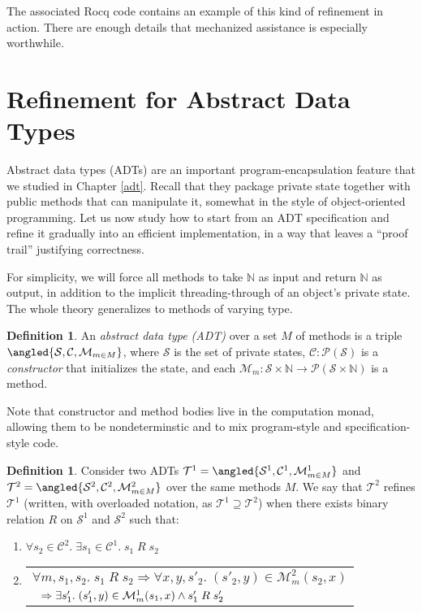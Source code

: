 \documentclass{amsbook}
\theoremstyle{definition}
\newtheorem{definition}[theorem]{Definition}
\theoremstyle{remark}
\numberwithin{section}{chapter}
\numberwithin{equation}{chapter}
\begin{document}
The associated Rocq code contains an example of this kind of refinement in action.
There are enough details that mechanized assistance is especially worthwhile.

\section{Refinement for Abstract Data Types}

Abstract data types (ADTs) are an important program-encapsulation feature that we studied in Chapter \ref{adt}.
Recall that they package private state together with public methods that can manipulate it, somewhat in the style of object-oriented programming.
Let us now study how to start from an ADT specification and refine it gradually into an efficient implementation, in a way that leaves a ``proof trail'' justifying correctness.

For simplicity, we will force all methods to take $\mathbb N$ as input and return $\mathbb N$ as output, in addition to the implicit threading-through of an object's private state.
The whole theory generalizes to methods of varying type.

\begin{definition}
  An \emph{abstract data type (ADT)} over a set $M$ of methods is a triple $\angled{\mathcal S, \mathcal C, \mathcal M_{m \in M}}$, where $\mathcal S$ is the set of private states, $\mathcal C : \mathcal P(\mathcal S)$ is a \emph{constructor} that initializes the state, and each $\mathcal M_m : \mathcal S \times \mathbb N \to \mathcal P(\mathcal S \times \mathbb N)$ is a method.
\end{definition}

Note that constructor and method bodies live in the computation monad, allowing them to be nondeterminstic and to mix program-style and specification-style code.

\begin{definition}
  Consider two ADTs $\mathcal T^1 = \angled{\mathcal S^1, \mathcal C^1, \mathcal M^1_{m \in M}}$ and $\mathcal T^2 = \angled{\mathcal S^2, \mathcal C^2, \mathcal M^2_{m \in M}}$ over the same methods $M$.
  We say that $\mathcal T^2$ refines $\mathcal T^1$ (written, with overloaded notation, as $\mathcal T^1 \supseteq \mathcal T^2$) when there exists binary relation $R$ on $\mathcal S^1$ and $\mathcal S^2$ such that:
  \begin{enumerate}
  \item $\forall s_2 \in \mathcal C^2. \; \exists s_1 \in \mathcal C^1. \; s_1 \; R \; s_2$
  \item \begin{tabular}{l}
    $\forall m, s_1, s_2. \; s_1 \; R \; s_2 \Rightarrow \forall x, y, s'_2. \; (s'_2, y) \in \mathcal M^2_m(s_2, x)$ \\
    $\hspace{.1in} \Rightarrow \exists s'_1. \; (s'_1, y) \in \mathcal M^1_m(s_1, x) \land s'_1 \; R \; s'_2$
  \end{tabular}
  \end{enumerate}
\end{definition}
\end{document}
